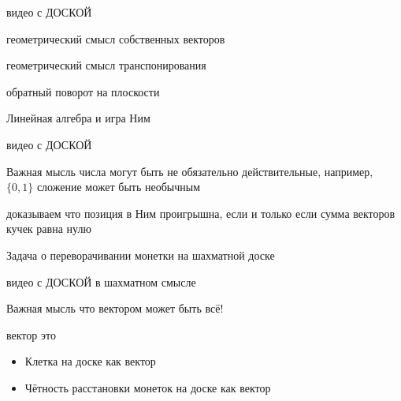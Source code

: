 \documentclass[14pt,xcolor=dvipsnames]{beamer}
\begin{document}
\begin{frame}{видео с ДОСКОЙ}

\begin{block}{геометрический смысл собственных векторов}
\end{block}

\begin{block}{геометрический смысл транспонирования}
\end{block}

\begin{block}{обратный поворот на плоскости}
\end{block}



\end{frame}



\begin{frame} %
  Линейная алгебра и игра Ним
\end{frame}


  
\begin{frame}{видео с ДОСКОЙ}

\begin{block}{Важная мысль}
числа могут быть не обязательно действительные, например, $\{0, 1\}$
сложение может быть необычным
\end{block}


\begin{block}{доказываем}
что позиция в Ним проигрышна, если и только если сумма векторов кучек равна нулю
\end{block}

\end{frame}

\begin{frame} %
  Задача о переворачивании монетки на шахматной доске
\end{frame}



\begin{frame}{видео с ДОСКОЙ в шахматном смысле}

\begin{block}{Важная мысль}
что вектором может быть всё!
\end{block}
    
\begin{block}{вектор это}
\begin{itemize}
   \item Клетка на доске как вектор
   \item Чётность расстановки монеток на доске как вектор
\end{itemize}
\end{block}


\end{frame}
\end{document}
